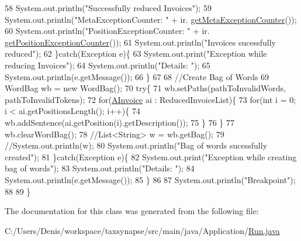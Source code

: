 \begin{DoxyCode}
58             System.out.println(\textcolor{stringliteral}{"Successfully reduced Invoices"});
59             System.out.println(\textcolor{stringliteral}{"MetaExceptionCounter: "} + ir.
      \hyperlink{class_reduced_invoice_1_1_invoice_reducer_a987de6f3876284a7b456240f85dc066f}{getMetaExceptionCounter}());
60             System.out.println(\textcolor{stringliteral}{"PositionExceptionCounter: "} + ir.
      \hyperlink{class_reduced_invoice_1_1_invoice_reducer_ad5034d72d8eae0edc2026c9ca9e66465}{getPositionExceptionCounter}());
61             System.out.println(\textcolor{stringliteral}{"Invoices sucessfully reduced"});
62         \}\textcolor{keywordflow}{catch}(Exception e)\{
63             System.out.print(\textcolor{stringliteral}{"Exception while reducing Invoices"});
64             System.out.println(\textcolor{stringliteral}{"Details: "});
65             System.out.println(e.getMessage());
66         \}
67         
68         \textcolor{comment}{//Create Bag of Words}
69         WordBag wb = \textcolor{keyword}{new} WordBag();
70         \textcolor{keywordflow}{try}\{
71             wb.setPaths(pathToInvalidWords, pathToInvalidTokens);
72             \textcolor{keywordflow}{for}(\hyperlink{class_reduced_invoice_1_1_a_invoice}{AInvoice} ai : ReducedInvoiceList)\{
73                 \textcolor{keywordflow}{for}(\textcolor{keywordtype}{int} i = 0; i < ai.getPositionsLength(); i++)\{
74                     wb.addSentence(ai.getPosition(i).getDescription());
75                 \}
76             \}
77             wb.clearWordBag();
78             \textcolor{comment}{//List<String> w = wb.getBag();}
79             \textcolor{comment}{//System.out.println(w);}
80             System.out.println(\textcolor{stringliteral}{"Bag of words sucessfully created"});
81         \}\textcolor{keywordflow}{catch}(Exception e)\{
82             System.out.print(\textcolor{stringliteral}{"Exception while creating bag of words"});
83             System.out.println(\textcolor{stringliteral}{"Details: "});
84             System.out.println(e.getMessage());
85         \}
86         
87         System.out.println(\textcolor{stringliteral}{"Breakpoint"});
88         
89     \}
\end{DoxyCode}


The documentation for this class was generated from the following file\+:\begin{DoxyCompactItemize}
\item 
C\+:/\+Users/\+Denis/workspace/taxsynapse/src/main/java/\+Application/\hyperlink{_run_8java}{Run.\+java}\end{DoxyCompactItemize}
